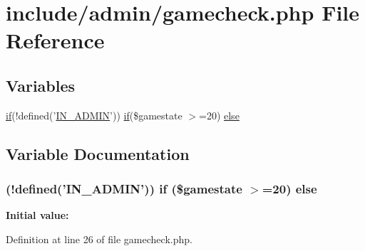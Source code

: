 \hypertarget{gamecheck_8php}{\section{include/admin/gamecheck.php File Reference}
\label{gamecheck_8php}
}
\subsection*{Variables}
\begin{DoxyCompactItemize}
\item 
\hyperlink{login__old_8php_a4ac1118c2e44c513a674bc1793ba6c90}{if}(!defined('\hyperlink{admin_8php_ad49472b0cdee543164375bf133a537f1}{I\+N\+\_\+\+A\+D\+M\+I\+N}')) \hyperlink{login__old_8php_a4ac1118c2e44c513a674bc1793ba6c90}{if}(\$gamestate $>$=20) \hyperlink{gamecheck_8php_a1b746f566262f9377d34e169baf256ed}{else}
\end{DoxyCompactItemize}


\subsection{Variable Documentation}
\hypertarget{gamecheck_8php_a1b746f566262f9377d34e169baf256ed}{
\subsubsection[{else}]{ (!defined('{\bf I\+N\+\_\+\+A\+D\+M\+I\+N}')) {\bf if} (\$gamestate $>$=20) else}}\label{gamecheck_8php_a1b746f566262f9377d34e169baf256ed}
{\bfseries Initial value\+:}


Definition at line 26 of file gamecheck.\+php.

